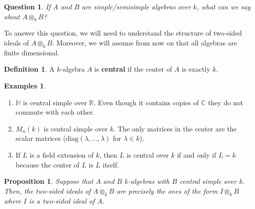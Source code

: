 \documentclass{tufte-handout} %
\newtheorem{prop}[thm]{Proposition}
\newtheorem{quest}[thm]{Question}
\theoremstyle{definition}
\newtheorem{defn}[thm]{Definition}
\newtheorem{exmps}[thm]{Examples}
\theoremstyle{remark}
\newcommand{\R}{\mathbb{R}}
\renewcommand{\C}{\mathbb{C}}
\newcommand{\bH}{\mathbb{H}}
\begin{document}
\begin{quest}
	If $A$ and $B$ are simple/semisimple algebras over $k$, what can we say about $A \otimes_k B$?
\end{quest}

To answer this question, we will need to understand the structure of two-sided ideals of $A \otimes_k B$. Moreover, we will assume from now on that all algebras are finite dimensional.

\begin{defn}
	A $k$-algebra $A$ is \textbf{central} if the center of $A$ is exactly $k$.
\end{defn}
\begin{exmps}
	\begin{enumerate}
		\item $\bH$ is central simple over $\R$. Even though it contains copies of $\C$ they do not commute with each other.
		\item $M_n(k)$ is central simple over $k$. The only matrices in the center are the scalar matrices ($\text{diag}(\lambda, \dots, \lambda)$ for $\lambda \in k$).
		\item If $L$ is a field extension of $k$, then $L$ is central over $k$ if and only if $L = k$ because the center of $L$ is $L$ itself.
	\end{enumerate}
\end{exmps}
\begin{prop}
	Suppose that $A$ and $B$ $k$-algebras with $B$ central simple over $k$. Then, the two-sided ideals of $A \otimes_k B$ are precisely the ones of the form $I \otimes_k B$ where $I$ is a two-sided ideal of $A$.
\end{prop}
\end{document}
